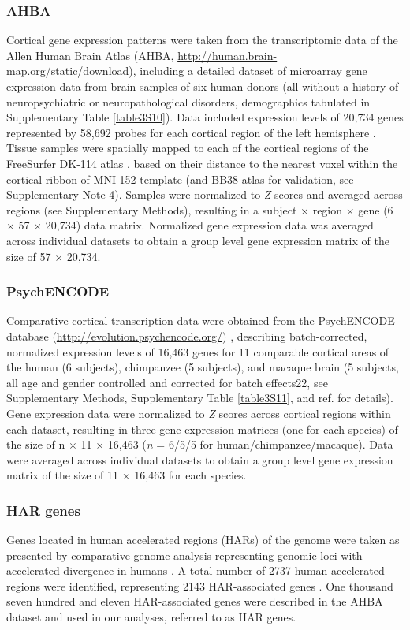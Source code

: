 \begin{refsection}
\subsubsection*{AHBA}
Cortical gene expression patterns were taken from the transcriptomic data of the Allen Human Brain Atlas (AHBA, \url{http://human.brain-map.org/static/download}), including a detailed dataset of microarray gene expression data from brain samples of six human donors (all without a history of neuropsychiatric or neuropathological disorders, demographics tabulated in Supplementary Table \ref{table3S10}). Data included expression levels of 20,734 genes represented by 58,692 probes for each cortical region of the left hemisphere \citep{Romme2017ConnectomeDA}. Tissue samples were spatially mapped to each of the cortical regions of the FreeSurfer DK-114 atlas \citep{DESIKAN2006968,CAMMOUN2012386}, based on their distance to the nearest voxel within the cortical ribbon of MNI 152 template (and BB38 atlas for validation, see Supplementary Note 4). Samples were normalized to \textit{Z} scores and averaged across regions (see Supplementary Methods), resulting in a subject $\times$ region $\times$ gene (6 $\times$ 57 $\times$ 20,734) data matrix. Normalized gene expression data was averaged across individual datasets to obtain a group level gene expression matrix of the size of 57 $\times$ 20,734.

\subsubsection*{PsychENCODE}
Comparative cortical transcription data were obtained from the PsychENCODE database (\url{http://evolution.psychencode.org/}) \citep{sousa2017molecular}, describing batch-corrected, normalized expression levels of 16,463 genes for 11 comparable cortical areas of the human (6 subjects), chimpanzee (5 subjects), and macaque brain (5 subjects, all age and gender controlled and corrected for batch effects22, see Supplementary Methods, Supplementary Table \ref{table3S11}, and ref. \citep{sousa2017molecular} for details). Gene expression data were normalized to \textit{Z} scores across cortical regions within each dataset, resulting in three gene expression matrices (one for each species) of the size of n $\times$ 11 $\times$ 16,463 (\textit{n} = 6/5/5 for human/chimpanzee/macaque). Data were averaged across individual datasets to obtain a group level gene expression matrix of the size of 11 $\times$ 16,463 for each species.

\subsubsection*{HAR genes}
Genes located in human accelerated regions (HARs) of the genome were taken as presented by comparative genome analysis representing genomic loci with accelerated divergence in humans \citep{doan2016mutations}. A total number of 2737 human accelerated regions were identified, representing 2143 HAR-associated genes \citep{doan2016mutations}. One thousand seven hundred and eleven HAR-associated genes were described in the AHBA dataset and used in our analyses, referred to as HAR genes.


\end{refsection}

